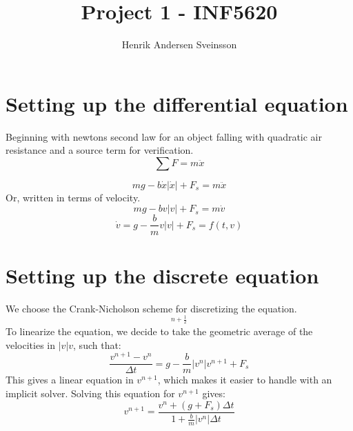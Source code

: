 \documentclass[a4paper, 10pt]{article}
\title{Project 1 - INF5620}
\author{Henrik Andersen Sveinsson}
\begin{document}
\maketitle

\section{Setting up the differential equation}
Beginning with newtons second law for an object falling  with quadratic  air resistance and a source term for verification.
\begin{equation}
	\sum F = m\ddot{x}
\end{equation}


\begin{equation}
	mg - b\dot{x}|\dot{x}| + F_s = m\ddot{x}
\end{equation}
Or, written in terms of velocity.
\begin{equation}
	mg- bv|v| + F_s = m\dot{v}
\end{equation}
\begin{equation}
	\dot{v} = g - \frac{b}{m}v|v| + F_s = f(t, v)
\end{equation}

\section{Setting up the discrete equation} %
\label{sec:setting_up_the_discrete_equation}

We choose the Crank-Nicholson scheme for discretizing the equation. 
\begin{equation}
	[D_t v = f(t, \bar{v}^{t, \theta})]^{n+\frac{1}{2}}
\end{equation}
To linearize the equation, we decide to take the geometric average of the velocities in $|v|v$, such that:
\begin{equation}
	\frac{v^{n+1} - v^{n}}{\Delta t} = g - \frac{b}{m}|v^n|v^{n+1} + F_s
\end{equation}
This gives a linear equation in $v^{n+1}$, which makes it easier to handle with an implicit solver. Solving this equation for $v^{n+1}$ gives:
\begin{equation}
	v^{n+1} = \frac{v^n + (g +F_s)\Delta t}{1+\frac{b}{m}|v^n|\Delta t}
\end{equation}
\end{document}
